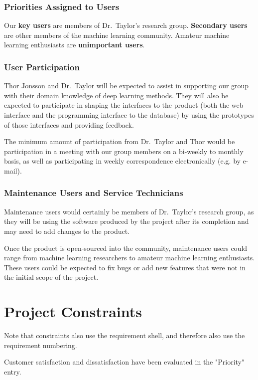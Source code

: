 \documentclass{scrreprt}
\begin{document}
\subsection{Priorities Assigned to Users}

Our \textbf{key users} are members of Dr.\ Taylor's research group.
\textbf{Secondary users} are other members of the machine learning community.
Amateur machine learning enthusiasts are \textbf{unimportant users}.

\subsection{User Participation}

Thor Jonsson and Dr.\ Taylor will be expected to assist in supporting our group
with their domain knowledge of deep learning methods. They will also be
expected to participate in shaping the interfaces to the product (both the web
interface and the programming interface to the database) by using the
prototypes of those interfaces and providing feedback.

The minimum amount of participation from Dr.\ Taylor and Thor would be
participation in a meeting with our group members on a bi-weekly to monthly
basis, as well as participating in weekly correspondence electronically (e.g.
by e-mail).

\subsection{Maintenance Users and Service Technicians}

Maintenance users would certainly be members of Dr.\ Taylor's research group,
as they will be using the software produced by the project after its completion
and may need to add changes to the product.

Once the product is open-sourced into the community, maintenance users could
range from machine learning researchers to amateur machine learning
enthusiasts. These users could be expected to fix bugs or add new features that
were not in the initial scope of the project.

\chapter{Project Constraints}

Note that constraints also use the requirement shell, and therefore also use
the requirement numbering.

Customer satisfaction and dissatisfaction have been evaluated in the "Priority" entry.
\end{document}
